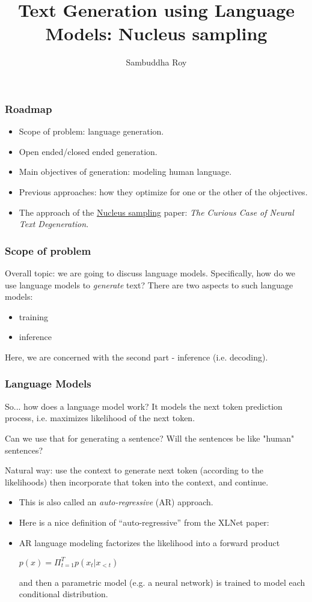 \documentclass[11pt]{beamer}
\title[Microsoft, March 27, 2020] %
{Text Generation using Language Models: Nucleus sampling}
\author{Sambuddha Roy}
\begin{document}
\begin{frame}
  \titlepage
\end{frame}

\begin{frame}
  \frametitle{Roadmap}
\begin{itemize}
  \item Scope of problem: language generation.
  \item Open ended/closed ended generation.
  \item Main objectives of generation: modeling human language.
  \item Previous approaches: how they optimize for one or the other of the objectives.
  \item The approach of the \href{https://arxiv.org/pdf/1904.09751.pdf}{Nucleus sampling} paper:
  {\em The Curious Case of Neural Text Degeneration}.
\end{itemize}
\end{frame}


\begin{frame}
  \frametitle{Scope of problem}
Overall topic: we are going to discuss language models. Specifically, how do we
use language models to {\em generate} text? There are two aspects to such language models:
\begin{itemize}
  \item training
  \item inference
\end{itemize}
Here, we are concerned with the second part - inference (i.e. decoding).
\end{frame}

\begin{frame}
  \frametitle{Language Models}
So... how does a language model work?
It models the next token prediction process, i.e. maximizes likelihood of the next token.

Can we use that for generating a sentence? Will the sentences be like "human" sentences?

Natural way: use the context to generate next token (according to the likelihoods) then
incorporate that token into the context, and continue.
\end{frame}

\begin{frame}
\begin{itemize}
  \item This is also called an {\em auto-regressive} (AR) approach.
  \item Here is a nice definition of ``auto-regressive'' from the XLNet paper:
  \item AR language modeling factorizes the likelihood into a forward product
\begin{center}
$p(x) = \Pi_{t=1}^T p(x_t | x_{<t})$
\end{center}
and then a parametric model (e.g. a neural network) is trained to model each
conditional distribution.
\end{itemize}
\end{frame}
\end{document}
